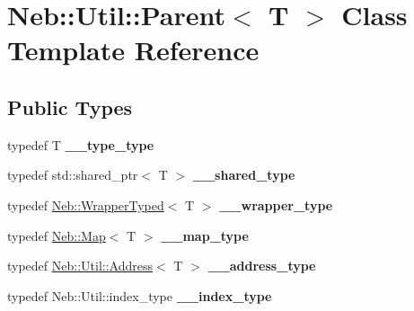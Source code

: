 \hypertarget{classNeb_1_1Util_1_1Parent}{\section{Neb\-:\-:Util\-:\-:Parent$<$ T $>$ Class Template Reference}
\label{classNeb_1_1Util_1_1Parent}
}
\subsection*{Public Types}
\begin{DoxyCompactItemize}
\item 
\hypertarget{classNeb_1_1Util_1_1Parent_ad05787b75eda23bc9e7d72953594f909}{typedef T {\bfseries \-\_\-\-\_\-type\-\_\-type}}\label{classNeb_1_1Util_1_1Parent_ad05787b75eda23bc9e7d72953594f909}

\item 
\hypertarget{classNeb_1_1Util_1_1Parent_a9e54b64f4988000354f83262c59a2def}{typedef std\-::shared\-\_\-ptr$<$ T $>$ {\bfseries \-\_\-\-\_\-shared\-\_\-type}}\label{classNeb_1_1Util_1_1Parent_a9e54b64f4988000354f83262c59a2def}

\item 
\hypertarget{classNeb_1_1Util_1_1Parent_adbbf2efbf5641dd25389d1d79c76a6fb}{typedef \hyperlink{classNeb_1_1WrapperTyped}{Neb\-::\-Wrapper\-Typed}$<$ T $>$ {\bfseries \-\_\-\-\_\-wrapper\-\_\-type}}\label{classNeb_1_1Util_1_1Parent_adbbf2efbf5641dd25389d1d79c76a6fb}

\item 
\hypertarget{classNeb_1_1Util_1_1Parent_a881390c2a1670aca797f1a32c0113be9}{typedef \hyperlink{classNeb_1_1Map}{Neb\-::\-Map}$<$ T $>$ {\bfseries \-\_\-\-\_\-map\-\_\-type}}\label{classNeb_1_1Util_1_1Parent_a881390c2a1670aca797f1a32c0113be9}

\item 
\hypertarget{classNeb_1_1Util_1_1Parent_a5a3b1085387d974e8560a359e2b09a72}{typedef \hyperlink{classNeb_1_1Util_1_1Address}{Neb\-::\-Util\-::\-Address}$<$ T $>$ {\bfseries \-\_\-\-\_\-address\-\_\-type}}\label{classNeb_1_1Util_1_1Parent_a5a3b1085387d974e8560a359e2b09a72}

\item 
\hypertarget{classNeb_1_1Util_1_1Parent_a3a31fcf8e0f941595e3f6f11bc7d9911}{typedef Neb\-::\-Util\-::index\-\_\-type {\bfseries \-\_\-\-\_\-index\-\_\-type}}\label{classNeb_1_1Util_1_1Parent_a3a31fcf8e0f941595e3f6f11bc7d9911}

\end{DoxyCompactItemize}
